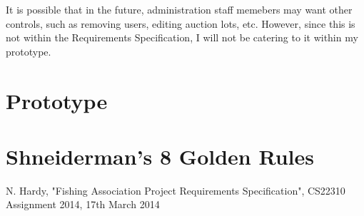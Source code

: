 \documentclass{article}
\begin{document}
It is possible that in the future, administration staff memebers may want other controls, such as removing users, editing auction lots, etc. However, since this is not within the Requirements Specification, I will not be catering to it within my prototype.


\section{Prototype}


\section{Shneiderman’s 8 Golden Rules}

\clearpage


\begin{thebibliography}{1}

 N. Hardy, "Fishing Association Project Requirements Specification", CS22310 Assignment 2014, 17th March 2014




\end{thebibliography}
\end{document}
